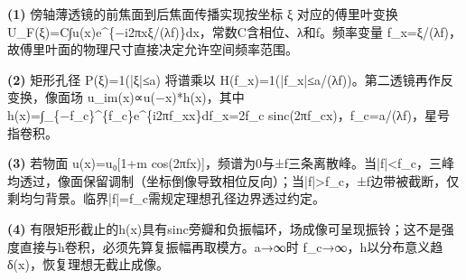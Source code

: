 \par\noindent\textbf{(1)} 傍轴薄透镜的前焦面到后焦面传播实现按坐标 ξ 对应的傅里叶变换 U\_F(ξ)=C∫u(x)e\textasciicircum{}\{−i2πxξ/(λf)\}dx，常数C含相位、λ和f。频率变量 f\_x=ξ/(λf)，故傅里叶面的物理尺寸直接决定允许空间频率范围。
\par\noindent\textbf{(2)} 矩形孔径 P(ξ)=1(|ξ|≤a) 将谱乘以 H(f\_x)=1(|f\_x|≤a/(λf))。第二透镜再作反变换，像面场 u\_im(x)∝u(−x)*h(x)，其中 h(x)=∫\_\{−f\_c\}\textasciicircum{}\{f\_c\}e\textasciicircum{}\{i2πf\_xx\}df\_x=2f\_c sinc(2πf\_cx)，f\_c=a/(λf)，星号指卷积。
\par\noindent\textbf{(3)} 若物面 u(x)=u₀[1+m cos(2πfx)]，频谱为0与±f三条离散峰。当|f|<f\_c，三峰均透过，像面保留调制（坐标倒像导致相位反向）；当|f|>f\_c，±f边带被截断，仅剩均匀背景。临界|f|=f\_c需规定理想孔径边界透过约定。
\par\noindent\textbf{(4)} 有限矩形截止的h(x)具有sinc旁瓣和负振幅环，场成像可呈现振铃；这不是强度直接与h卷积，必须先算复振幅再取模方。a→∞时 f\_c→∞，h以分布意义趋δ(x)，恢复理想无截止成像。
